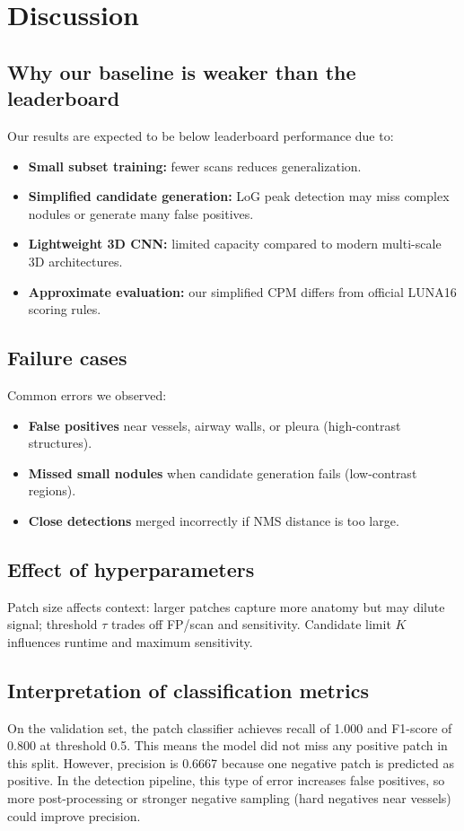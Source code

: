 \section{Discussion}
\subsection{Why our baseline is weaker than the leaderboard}
Our results are expected to be below leaderboard performance due to:
\begin{itemize}
  \item \textbf{Small subset training:} fewer scans reduces generalization.
  \item \textbf{Simplified candidate generation:} LoG peak detection may miss complex nodules or generate many false positives.
  \item \textbf{Lightweight 3D CNN:} limited capacity compared to modern multi-scale 3D architectures.
  \item \textbf{Approximate evaluation:} our simplified CPM differs from official LUNA16 scoring rules.
\end{itemize}

\subsection{Failure cases}
Common errors we observed:
\begin{itemize}
  \item \textbf{False positives} near vessels, airway walls, or pleura (high-contrast structures).
  \item \textbf{Missed small nodules} when candidate generation fails (low-contrast regions).
  \item \textbf{Close detections} merged incorrectly if NMS distance is too large.
\end{itemize}

\subsection{Effect of hyperparameters}
Patch size affects context: larger patches capture more anatomy but may dilute signal; threshold $\tau$ trades off FP/scan and sensitivity. Candidate limit $K$ influences runtime and maximum sensitivity.

\subsection{Interpretation of classification metrics}
On the validation set, the patch classifier achieves recall of 1.000 and F1-score of 0.800 at threshold 0.5. This means the model did not miss any positive patch in this split. However, precision is 0.6667 because one negative patch is predicted as positive. In the detection pipeline, this type of error increases false positives, so more post-processing or stronger negative sampling (hard negatives near vessels) could improve precision.
